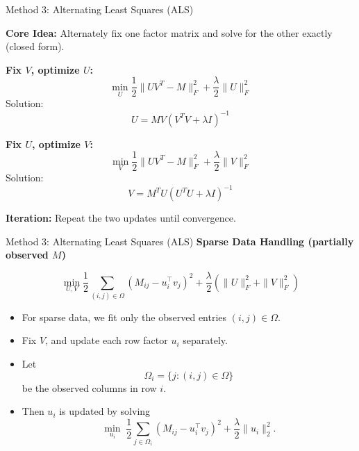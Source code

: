 \documentclass[aspectratio=169,usenames,dvipsnames]{beamer}
\begin{document}
\begin{frame}{Method 3: Alternating Least Squares (ALS)}

\textbf{Core Idea:} Alternately fix one factor matrix and solve for the other exactly (closed form).

\vspace{0.2cm}
\textbf{Fix $V$, optimize $U$:}
\[
\min_U \frac{1}{2}\|UV^T - M\|_F^2 + \frac{\lambda}{2}\|U\|_F^2
\]
Solution:
\[
U = M V (V^T V + \lambda I)^{-1}
\]

\vspace{0.2cm}
\textbf{Fix $U$, optimize $V$:}
\[
\min_V \frac{1}{2}\|UV^T - M\|_F^2 + \frac{\lambda}{2}\|V\|_F^2
\]
Solution:
\[
V = M^T U (U^T U + \lambda I)^{-1}
\]

\vspace{0.2cm}
\textbf{Iteration:} Repeat the two updates until convergence.  

\end{frame}






\begin{frame}{Method 3: Alternating Least Squares (ALS)}
\textbf{Sparse Data Handling (partially observed \(M\))}

\[
\min_{U,V}
\frac12\sum_{(i,j)\in\Omega}\left(M_{ij}-u_i^\top v_j\right)^2
+\frac{\lambda}{2}\left(\|U\|_F^2+\|V\|_F^2\right)
\]

\begin{itemize}
    \item For sparse data, we fit only the observed entries \((i,j)\in\Omega\).
    \item Fix \(V\), and update each row factor \(u_i\) separately.
    \item Let
    \[
    \Omega_i=\{j:(i,j)\in\Omega\}
    \]
    be the observed columns in row \(i\).
    \item Then \(u_i\) is updated by solving
    \[
    \min_{u_i}\;
    \frac12\sum_{j\in\Omega_i}\left(M_{ij}-u_i^\top v_j\right)^2
    +\frac{\lambda}{2}\|u_i\|_2^2.
    \]
\end{itemize}
\end{frame}
\end{document}
